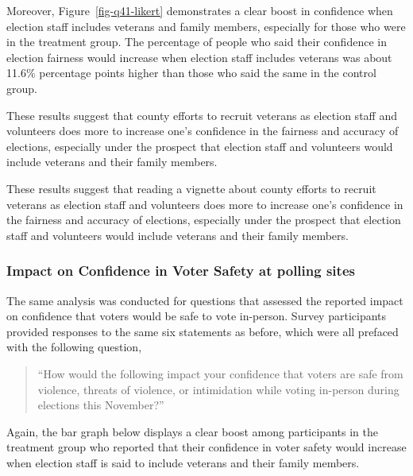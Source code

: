 \documentclass[
  11pt,
  a4paper,
]{article}
\begin{document}
Moreover, Figure~\ref{fig-q41-likert} demonstrates a clear boost in
confidence when election staff includes veterans and family members,
especially for those who were in the treatment group. The percentage of
people who said their confidence in election fairness would increase
when election staff includes veterans was about 11.6\% percentage points
higher than those who said the same in the control group.

These results suggest that county efforts to recruit veterans as
election staff and volunteers does more to increase one's confidence in
the fairness and accuracy of elections, especially under the prospect
that election staff and volunteers would include veterans and their
family members.

These results suggest that reading a vignette about county efforts to
recruit veterans as election staff and volunteers does more to increase
one's confidence in the fairness and accuracy of elections, especially
under the prospect that election staff and volunteers would include
veterans and their family members.

\subsubsection{Impact on Confidence in Voter Safety at polling
sites}\label{impact-on-confidence-in-voter-safety-at-polling-sites}

The same analysis was conducted for questions that assessed the reported
impact on confidence that voters would be safe to vote in-person. Survey
participants provided responses to the same six statements as before,
which were all prefaced with the following question,

\begin{quote}
``How would the following impact your confidence that voters are safe
from violence, threats of violence, or intimidation while voting
in-person during elections this November?''
\end{quote}

Again, the bar graph below displays a clear boost among participants in
the treatment group who reported that their confidence in voter safety
would increase when election staff is said to include veterans and their
family members.
\end{document}
